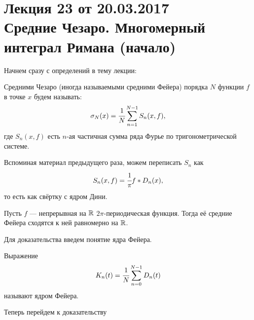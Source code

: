 \pagestyle{fancy}
\section{Лекция 23 от 20.03.2017 \\ Средние Чезаро. Многомерный интеграл Римана (начало)}
	Начнем сразу с определений в тему лекции:
	\begin{Def}
		Средними Чезаро (иногда называемыми средними Фейера) порядка $N$ функции $f$ в точке $x$ будем называть:
		$$
			\sigma_N(x) = \cfrac{1}{N} \sum\limits_{n =1}^{N -1}S_n(x,f),
		$$
		 где $S_n(x,f)$ есть $n$-ая частичная сумма ряда Фурье по тригонометрической системе.
	\end{Def}
	Вспоминая материал предыдущего раза, можем переписать $S_n$ как
	$$
		S_n(x,f) = \cfrac{1}{\pi} f*D_n(x),
	$$
	 то есть как свёртку с ядром Дини.
	\begin{Theorem}
		Пусть $f$ --- непрерывная на $\mathbb{R}$ $2\pi$-периодическая функция. Тогда её средние Фейера сходятся к ней равномерно на $\mathbb{R}$. 
	\end{Theorem}
	Для доказательства введем понятие ядра Фейера.
	\begin{Def}
		Выражение
		$$
			K_n(t) = \cfrac{1}{N}\sum\limits_{n=0}^{N-1}D_n(t)
		$$
		называют ядром Фейера.
	\end{Def}
	Теперь перейдем к доказательству
